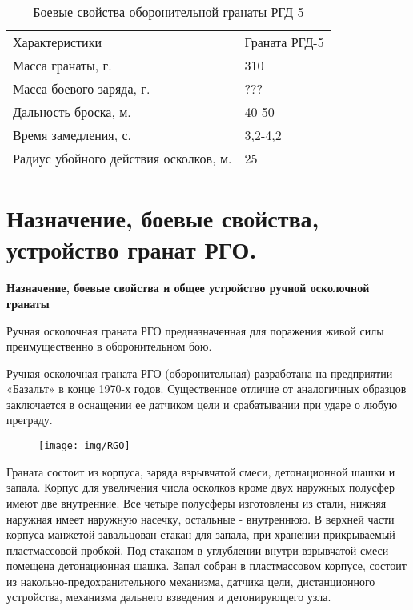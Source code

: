 \documentclass[12pt,a4paper]{report}
\begin{document}
\begin{table}[h!]
	\caption{Боевые свойства оборонительной гранаты РГД-5}
	\label{tabular:RGD5}
	\begin{center}
		\begin{tabular}{|l|l|}
			\hline
			\rowcolor[gray]{.9} Характеристики &  Граната РГД-5\\
			Масса гранаты, г.	& 310\\
			Масса боевого заряда, г.	& ???\\
			Дальность броска, м.	& 40-50\\
			Время замедления, с.	& 3,2-4,2\\
			Радиус убойного действия осколков, м.	& 25\\
			\hline
		\end{tabular}
	\end{center}
\end{table}

\section{Назначение, боевые свойства, устройство гранат РГО.}
\textbf{Назначение, боевые свойства и общее устройство ручной осколочной гранаты }

Ручная осколочная граната РГО предназначенная для поражения живой силы преимущественно в оборонительном бою.

Ручная осколочная граната РГО (оборонительная) разработана на предприятии «Базальт» в конце 1970-х годов. Существенное отличие от аналогичных образцов заключается в оснащении ее датчиком цели и срабатывании при ударе о любую преграду.

\begin{figure}[h]
\centering
\texttt{[image: img/RGO]}
\caption[Граната РГО]{}
\label{fig:RGO}
\end{figure}
Граната состоит из корпуса, заряда взрывчатой смеси, детонационной шашки и запала. Корпус для увеличения числа осколков кроме двух наружных полусфер имеют две внутренние. Все четыре полусферы изготовлены из стали, нижняя наружная имеет наружную насечку, остальные - внутреннюю. В верхней части корпуса манжетой завальцован стакан для запала, при хранении прикрываемый пластмассовой пробкой. Под стаканом в углублении внутри взрывчатой смеси помещена детонационная шашка. Запал собран в пластмассовом корпусе, состоит из накольно-предохранительного механизма, датчика цели, дистанционного устройства, механизма дальнего взведения и детонирующего узла.
\end{document}

